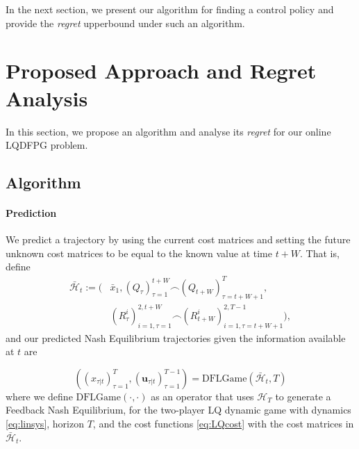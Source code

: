 \documentclass[letterpaper, 10 pt, conference]{ieeeconf}  %
\begin{document}
In the next section, we present our algorithm for finding a control policy and provide the \emph{regret} upperbound under such an algorithm.

\section{Proposed Approach and Regret Analysis}\label{sec:approach}
In this section, we propose an algorithm and analyse its \emph{regret} for our online LQDFPG problem.

\subsection{Algorithm}

\paragraph{Prediction} 

We predict a trajectory by using the current cost matrices and setting the future unknown cost matrices to be equal to the known value at time $t+W$. That is, define 
\begin{equation*}
\begin{split}
    \bar{\mathcal{H}}_{t} := (&\bar{x}_{1}, (Q_{\tau})_{\tau=1}^{t+W} \frown(Q_{t+W})_{\tau=t+W+1}^{T},\\
    &(R_{\tau}^{i})_{i=1,\tau=1}^{2,t+W} \frown(R_{t+W}^{i})_{i=1,\tau=t+W+1}^{2,T-1}),
\end{split}
\end{equation*}
and our predicted Nash Equilibrium trajectories given the information available at $t$ are

\begin{equation*}
    ((x_{\tau|t})_{\tau=1}^{T},(\mathbf{u}_{\tau|t})_{\tau=1}^{T-1}) = \text{DFLGame}(\bar{\mathcal{H}}_{t},T)
\end{equation*}
where we define $\text{DFLGame}(\cdot, \cdot)$ as an operator that uses $\mathcal{H}_{T}$ to generate a Feedback Nash Equilibrium, for the two-player LQ dynamic game with dynamics \eqref{eq:linsys}, horizon $T$, and the cost functions \eqref{eq:LQcost} with the cost matrices in $\bar{\mathcal{H}}_{t}$.
\end{document}
